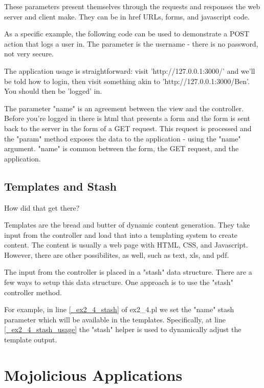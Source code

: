 \documentclass[14pt]{extreport}
\newcommand\Small{\fontsize{12}{13.0}\fontencoding{T1}\selectfont}
\newcommand*\LSTfont{\Small\ttfamily\SetTracking{encoding=*}{-60}\lsstyle}
\begin{document}
These parameters present themselves through the requests and responses the web
server and client make.  They can be in href URLs, forms, and javascript code.

As a specific example, the following code can be used to demonstrate a POST
action that logs a user in.  The parameter is the username - there is no
password, not very secure.



The application usage is straightforward: visit 'http://127.0.0.1:3000/' and
we'll be told how to login, then visit something akin to
'http://127.0.0.1:3000/Ben'.  You should then be 'logged' in.

The parameter "name" is an agreement between the view and the controller.
Before you're logged in there is html that presents a form and the form is sent
back to the server in the form of a GET request.  This request is processed
and the "param" method exposes the data to the application - using the "name"
argument.  "name" is common between the form, the GET request, and the
application.

\section{Templates and Stash}

{\Large How did that get there?}

Templates are the bread and butter of dynamic content generation.  They take
input from the controller and load that into a templating system to create
content.  The content is usually a web page with HTML, CSS, and Javascript.
However, there are other possibilites, as well, such as text, xls, and pdf.

The input from the controller is placed in a "stash" data structure.  There are
a few ways to setup this data structure.  One approach is to use the "stash"
controller method.



For example, in line \ref{_ex2_4_stash} of ex2\_4.pl we set the "name" stash 
parameter which will be available in the templates.  Specifically, at line 
\ref{_ex2_4_stash_usage} the "stash" helper is used to dynamically adjust
the template output.

\chapter*{Mojolicious Applications}
\end{document}
